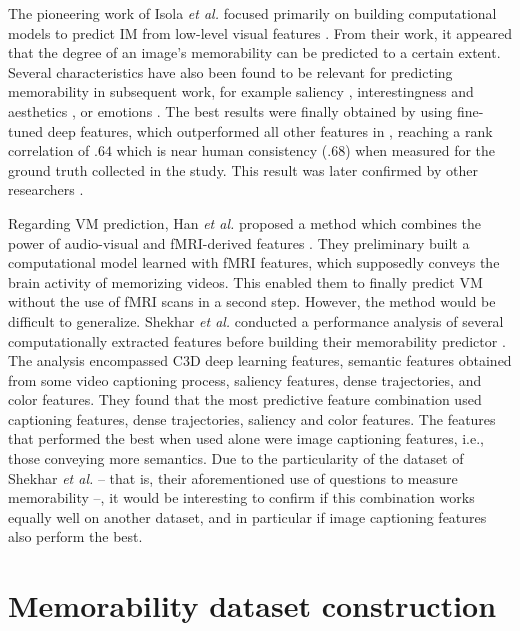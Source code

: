 \documentclass[sigconf]{acmart}
\begin{document}
The pioneering work of Isola \textit{et al.} focused primarily on building computational models to predict IM from low-level visual features \cite{isola_2011_makes}.
From their work, it appeared that the degree of an image's memorability can be predicted to a certain extent.
Several characteristics have also been found to be relevant for predicting memorability in subsequent work, for example saliency \cite{mancas_2013_memorability}, interestingness and aesthetics \cite{isola_2014_makes}, or emotions \cite{khosla_2015_understanding}.
The best results were finally obtained by using fine-tuned deep features, which outperformed all other features in \cite{khosla_2015_understanding}, reaching a rank correlation of $.64$ which is near human consistency ($.68$) when measured for the ground truth collected in the study.
This result was later confirmed by other researchers \cite{baveye_2016_deep,squalli_2017_deep}.

Regarding VM prediction, Han \textit{et al.} proposed a method which combines the power of audio-visual and fMRI-derived features \cite{han_2015_learning}.
They preliminary built a computational model learned with fMRI features, which supposedly conveys the brain activity of memorizing videos.
This enabled them to finally predict VM without the use of fMRI scans in a second step.
However, the method would be difficult to generalize.
Shekhar \textit{et al.} conducted a performance analysis of several computationally extracted features before building their memorability predictor \cite{shekhar_2017_show}.
The analysis encompassed C3D deep learning features, semantic features obtained from some video captioning process, saliency features, dense trajectories, and color features.
They found that the most predictive feature combination used captioning features, dense trajectories, saliency and color features.
The features that performed the best when used alone were image captioning features, i.e., those conveying more semantics.
Due to the particularity of the dataset of Shekhar \textit{et al.} -- that is, their aforementioned use of questions to measure memorability --, it would be interesting to confirm if this combination works equally well on another dataset, and in particular if image captioning features also perform the best.

\section{Memorability dataset construction}
\label{section_dataset_construction}
\end{document}
